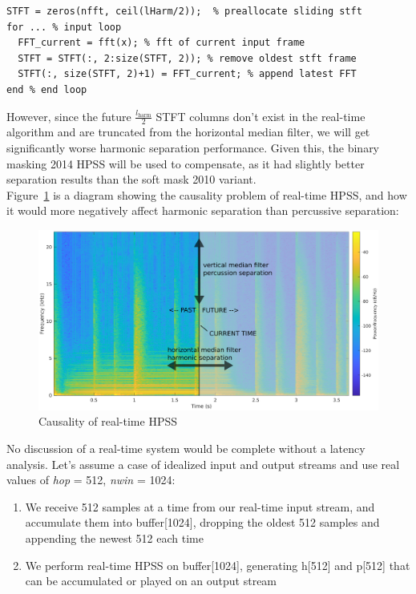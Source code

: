 \documentclass[letter,12pt]{article}
\begin{document}
\begin{verbatim}
STFT = zeros(nfft, ceil(lHarm/2));  % preallocate sliding stft
for ... % input loop
  FFT_current = fft(x); % fft of current input frame
  STFT = STFT(:, 2:size(STFT, 2)); % remove oldest stft frame 
  STFT(:, size(STFT, 2)+1) = FFT_current; % append latest FFT
end % end loop
\end{verbatim}

However, since the future $\frac{l_{\text{harm}}}{2}$ STFT columns don't exist in the real-time algorithm and are truncated from the horizontal median filter, we will get significantly worse harmonic separation performance. Given this, the binary masking 2014 HPSS will be used to compensate, as it had slightly better separation results than the soft mask 2010 variant.\\

Figure~\ref{fig:causality} is a diagram showing the causality problem of real-time HPSS, and how it would more negatively affect harmonic separation than percussive separation:

\begin{figure}[H]
	\centering
	\includegraphics[width=16cm]{../images/hpss_causality.png}
	\caption{Causality of real-time HPSS}
	\label{fig:causality}
\end{figure}

No discussion of a real-time system would be complete without a latency analysis. Let's assume a case of idealized input and output streams and use real values of \textit{hop} = 512, \textit{nwin} = 1024:

\begin{enumerate}
	\item
		We receive 512 samples at a time from our real-time input stream, and accumulate them into buffer[1024], dropping the oldest 512 samples and appending the newest 512 each time
	\item
		We perform real-time HPSS on buffer[1024], generating h[512] and p[512] that can be accumulated or played on an output stream
\end{enumerate}
\end{document}
